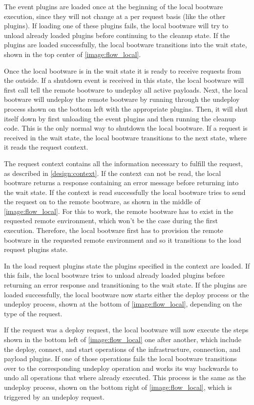 The event plugins are loaded once at the beginning of the local bootware execution, since they will not change at a per request basis (like the other plugins).
If loading one of these plugins fails, the local bootware will try to unload already loaded plugins before continuing to the cleanup state.
If the plugins are loaded successfully, the local bootware transitions into the wait state, shown in the top center of \autoref{image:flow_local}.

Once the local bootware is in the wait state it is ready to receive requests from the outside.
If a shutdown event is received in this state, the local bootware will first call tell the remote bootware to undeploy all active payloads.
Next, the local bootware will undeploy the remote bootware by running through the undeploy process shown on the bottom left with the appropriate plugins.
Then, it will shut itself down by first unloading the event plugins and then running the cleanup code.
This is the only normal way to shutdown the local bootware.
If a request is received in the wait state, the local bootware transitions to the next state, where it reads the request context.

The request context contains all the information necessary to fulfill the request, as described in \autoref{design:context}.
If the context can not be read, the local bootware returns a response containing an error message before returning into the wait state.
If the context is read successfully the local bootware tries to send the request on to the remote bootware, as shown in the middle of \autoref{image:flow_local}.
For this to work, the remote bootware has to exist in the requested remote environment, which won't be the case during the first execution.
Therefore, the local bootware first has to provision the remote bootware in the requested remote environment and so it transitions to the load request plugins state.

In the load request plugins state the plugins specified in the context are loaded.
If this fails, the local bootware tries to unload already loaded plugins before returning an error response and transitioning to the wait state.
If the plugins are loaded successfully, the local bootware now starts either the deploy process or the undeploy process, shown at the bottom of \autoref{image:flow_local}, depending on the type of the request.

If the request was a deploy request, the local bootware will now execute the steps shown in the bottom left of \autoref{image:flow_local} one after another, which include the deploy, connect, and start operations of the infrastructure, connection, and payload plugins.
If one of those operations fails the local bootware transitions over to the corresponding undeploy operation and works its way backwards to undo all operations that where already executed.
This process is the same as the undeploy process, shown on the bottom right of \autoref{image:flow_local}, which is triggered by an undeploy request.

